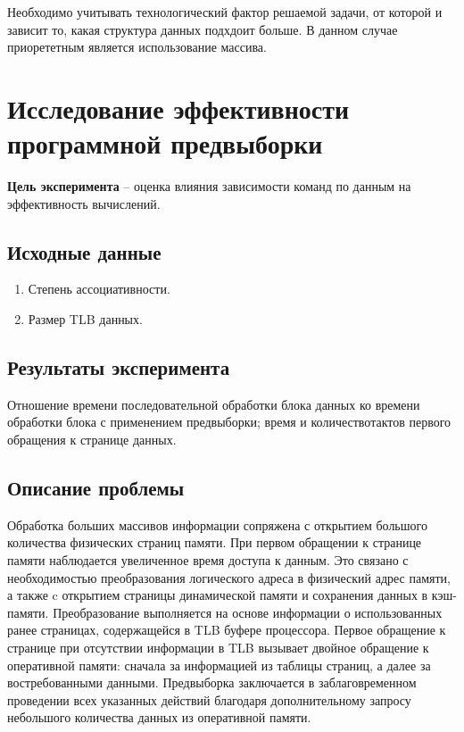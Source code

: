 Необходимо учитывать технологический фактор решаемой задачи, от которой и зависит то, какая структура данных подхдоит больше. В данном случае приорететным является использование массива. 




\section{Исследование эффективности программной предвыборки}

\textbf{Цель эксперимента} -- оценка   влияния   зависимости   команд   по   данным   на эффективность вычислений.

\subsection{Исходные данные}
\begin{enumerate}
	\item Степень ассоциативности.
	\item Размер TLB данных.
\end{enumerate}

\subsection{Результаты эксперимента}
Отношение времени последовательной обработки блока данных ко времени обработки блока с применением предвыборки; время и количествотактов первого обращения к странице  данных.


\subsection{Описание проблемы}
Обработка больших массивов информации сопряжена с открытием большого количества физических страниц памяти.  При первом обращении к странице памяти наблюдается   увеличенное время доступа к данным. Это связано с необходимостью преобразования логического адреса в физический адрес памяти, а также c открытием   страницы   динамической   памяти   и   сохранения   данных   в   кэш-памяти. Преобразование выполняется на основе информации о использованных ранее страницах, содержащейся в TLB буфере процессора. Первое обращение к странице при отсутствии информации   в  TLB  вызывает двойное обращение к оперативной памяти: сначала за информацией из таблицы страниц, а далее за востребованными данными.   Предвыборка заключается   в   заблаговременном   проведении   всех   указанных   действий   благодаря дополнительному запросу небольшого количества данных из оперативной памяти.

